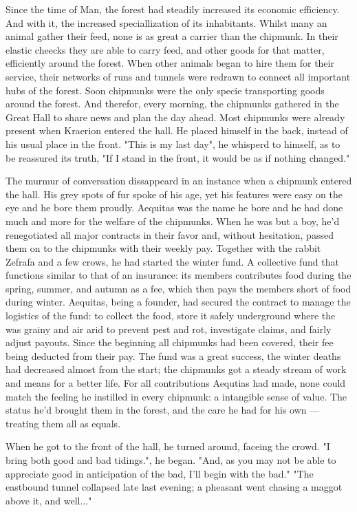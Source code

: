 \documentclass[smalldemyvopaper,11pt,twoside,onecolumn,openright,extrafontsizes]{memoir}
\begin{document}
Since the time of Man, the forest had steadily increased its economic efficiency. And with it, the increased speciallization of its inhabitants. Whilst many an animal gather their feed, none is as great a carrier than the chipmunk. In their elastic cheecks they are able to carry feed, and other goods for that matter, efficiently around the forest. When other animals began to hire them for their service, their networks of runs and tunnels were redrawn to connect all important hubs of the forest. Soon chipmunks were the only specie transporting goods around the forest. And therefor, every morning, the chipmunks gathered in the Great Hall to share news and plan the day ahead.
  Most chipmunks were already present when Kraerion entered the hall. He placed himself in the back, instead of his usual place in the front.
"This is my last day", he whisperd to himself, as to be reassured its truth, "If I stand in the front, it would be as if nothing changed."

The murmur of conversation dissappeard in an instance when a chipmunk entered the hall. His grey spots of fur spoke of his age, yet his features were easy on the eye and he bore them proudly.
 Aequitas was the name he bore and he had done much and more for the welfare of the chipmunks. When he was but a boy, he'd renegotiated all major contracts in their favor and, without hesitation, passed them on to the chipmunks with their weekly pay. Together with the rabbit Zefrafa and a few crows, he had started the winter fund. A collective fund that functions similar to that of an insurance: its members contributes food during the spring, summer, and autumn as a fee, which then pays the members short of food during winter. Aequitas, being a founder, had secured the contract to manage the logistics of the fund: to collect the food, store it safely underground where the was grainy and air arid to prevent pest and rot, investigate claims, and fairly adjust payouts. Since the beginning all chipmunks had been covered, their fee being deducted from their pay. The fund was a great success, the winter deaths had decreased almost from the start; the chipmunks got a steady stream of work and means for a better life.
For all contributions Aequtias had made, none could match the feeling he instilled in every chipmunk: a intangible sense of value. The status he'd brought them in the forest, and the care he had for his own — treating them all as equals.

When he got to the front of the hall, he turned around, faceing the crowd.
"I bring both good and bad tidings.", he began. "And, as you may not be able to appreciate good in anticipation of the bad, I'll begin with the bad."
  "The eastbound tunnel collapsed late last evening; a pheasant went chasing a maggot above it, and well..."
\end{document}
